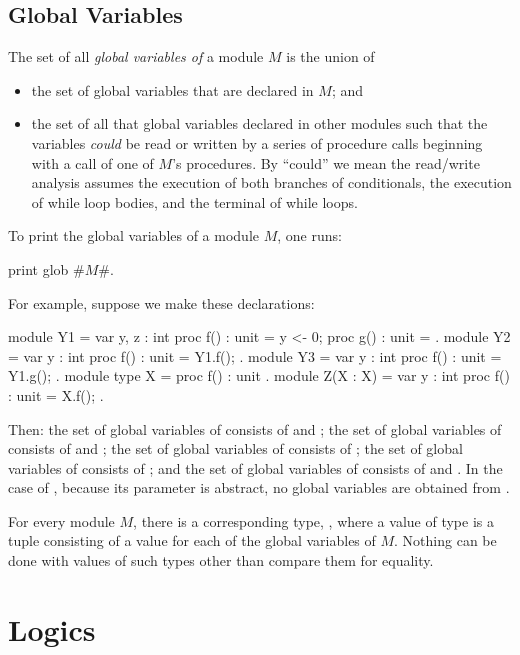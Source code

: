 \subsection{Global Variables}
\label{GlobalVariables}

The set of all \emph{global variables of} a module $M$ is the
union of
\begin{itemize}
\item the set of global variables that are declared in $M$; and

\item the set of all that global variables declared in other modules
  such that the variables \emph{could} be read or written by a series
  of procedure calls beginning with a call of one of $M$'s
  procedures. By ``could'' we mean the read/write analysis assumes the
  execution of both branches of conditionals, the execution of while
  loop bodies, and the terminal of while loops.
\end{itemize}
To print the global variables of a module $M$, one runs:
\begin{easycrypt}{}{}
print glob #$M$#.
\end{easycrypt}

For example, suppose we make these declarations:
\begin{easycrypt}{}{}
module Y1 = {
  var y, z : int
  proc f() : unit = { y <- 0; }
  proc g() : unit = { }
}.
module Y2 = {
  var y : int
  proc f() : unit = { Y1.f(); }
}.
module Y3 = {
  var y : int
  proc f() : unit = { Y1.g(); }
}.
module type X = {
  proc f() : unit
}.
module Z(X : X) = {
  var y : int
  proc f() : unit = { X.f(); }
}.
\end{easycrypt}
Then: the set of global variables of  consists of  and
; the set of global variables of  consists of
 and ; the set of global variables of 
consists of ; the set of global variables of  consists
of ; and the set of global variables of  consists of
 and . In the case of , because its parameter
 is abstract, no global variables are obtained from .

For every module $M$, there is a corresponding type, ,
where a value of type  is a tuple consisting of
a value for each of the global variables of $M$. Nothing can be done with
values of such types other than compare them for equality.

\section{Logics}

